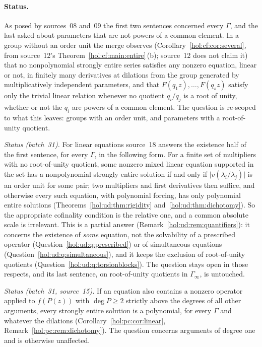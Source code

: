 \documentclass[11pt]{article}
\numberwithin{equation}{section}
\theoremstyle{definition}
\theoremstyle{remark}
\newcommand{\abs}[1]{\lvert#1\rvert}
\begin{document}
\paragraph{Status.}
As posed by sources~08 and~09 the first two sentences concerned every
$\Gamma$, and the last asked about parameters that are not powers of a common
element. In a group without an order unit the merge observes
(Corollary~\ref{hol:cf:cor:several}, from source~12's
Theorem~\ref{hol:cf:main:entire}\,(b); source~12 does not claim it) that no
nonpolynomial strongly entire series satisfies any nonzero equation, linear or
not, in finitely many derivatives at dilations from the group generated by
multiplicatively independent parameters, and that $F(q_1z),\ldots,F(q_sz)$
satisfy only the trivial linear relation whenever no quotient $q_i/q_j$ is a
root of unity, whether or not the $q_i$ are powers of a common element. The
question is re-scoped to what this leaves: groups with an order unit, and
parameters with a root-of-unity quotient.

\emph{Status (batch~31).} For linear equations source~18 answers the
existence half of the first sentence, for every $\Gamma$, in the following
form. For a finite set of multipliers with no root-of-unity quotient, some
nonzero mixed linear equation supported in the set has a nonpolynomial
strongly entire solution if and only if $\abs{v(\lambda_i/\lambda_j)}$ is an
order unit for some pair; two multipliers and first derivatives then suffice,
and otherwise every such equation, with polynomial forcing, has only
polynomial entire solutions (Theorems~\ref{hol:ud:thm:rigidity}
and~\ref{hol:ud:thm:dichotomy}). So the appropriate cofinality condition is
the relative one, and a common absolute scale is irrelevant. This is a
partial answer (Remark~\ref{hol:ud:rem:quantifiers}): it concerns the
existence of \emph{some} equation, not the solvability of a prescribed
operator (Question~\ref{hol:ud:q:prescribed}) or of simultaneous equations
(Question~\ref{hol:ud:q:simultaneous}), and it keeps the exclusion of
root-of-unity quotients (Question~\ref{hol:ud:q:torsionblocks}). The question
stays open in those respects, and its last sentence, on root-of-unity
quotients in $\Gamma_\infty$, is untouched.

\emph{Status (batch~31, source~15).} If an equation also contains a nonzero
operator applied to $f(P(z))$ with $\deg P\ge2$ strictly above the degrees of
all other arguments, every strongly entire solution is a polynomial, for
every $\Gamma$ and whatever the dilations
(Corollary~\ref{hol:pc:cor:linear}, Remark~\ref{hol:pc:rem:dichotomy}). The
question concerns arguments of degree one and is otherwise unaffected.
\end{document}
